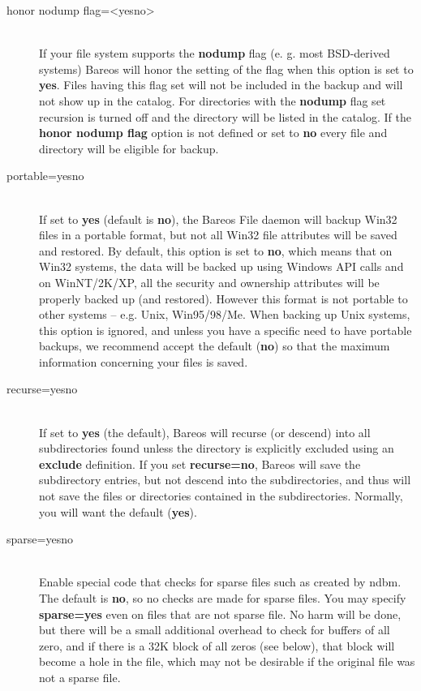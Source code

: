 \begin{description}
\item [honor nodump flag={\textless}yes{\textbar}no{\textgreater}] \hfill \\
   If your file system supports the {\bf nodump} flag (e. g. most
   BSD-derived systems) Bareos will honor the setting of the flag
   when this option is set to {\bf yes}. Files having this flag set
   will not be included in the backup and will not show up in the
   catalog. For directories with the {\bf nodump} flag set recursion
   is turned off and the directory will be listed in the catalog.
   If the {\bf honor nodump flag} option is not defined
   or set to {\bf no} every file and directory will be eligible for
   backup.

\item [portable=yes{\textbar}no] \hfill \\
\label{portable}
   If set to {\bf yes} (default is {\bf no}), the Bareos File daemon will
   backup Win32 files in a portable format, but not all Win32 file
   attributes will be saved and restored.  By default, this option is set
   to {\bf no}, which means that on Win32 systems, the data will be backed
   up using Windows API calls and on WinNT/2K/XP, all the security and
   ownership attributes will be properly backed up (and restored).  However
   this format is not portable to other systems -- e.g.  Unix, Win95/98/Me.
   When backing up Unix systems, this option is ignored, and unless you
   have a specific need to have portable backups, we recommend accept the
   default ({\bf no}) so that the maximum information concerning your files
   is saved.

\item [recurse=yes{\textbar}no] \hfill \\
   If set to {\bf yes} (the default), Bareos will recurse (or descend) into
   all subdirectories found unless the directory is explicitly excluded
   using an {\bf exclude} definition.  If you set {\bf recurse=no}, Bareos
   will save the subdirectory entries, but not descend into the
   subdirectories, and thus will not save the files or directories
   contained in the subdirectories.  Normally, you will want the default
   ({\bf yes}).

\item [sparse=yes{\textbar}no] \hfill \\
   Enable special code that checks for sparse files such as created by
   ndbm.  The default is {\bf no}, so no checks are made for sparse files.
   You may specify {\bf sparse=yes} even on files that are not sparse file.
   No harm will be done, but there will be a small additional overhead to
   check for buffers of all zero, and if there is a 32K block of all zeros
   (see below), that block will become a hole in the file, which
   may not be desirable if the original file was not a sparse file.


\end{description}
